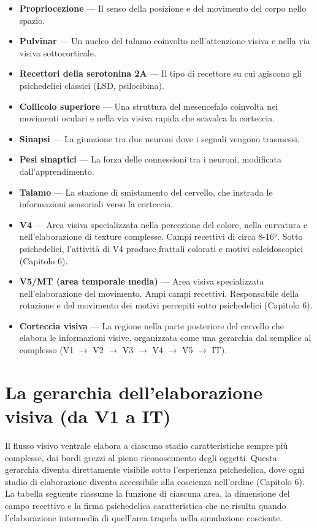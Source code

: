 \documentclass[11pt, twoside, openright]{book}
\begin{document}
\begin{itemize}
  \item \textbf{Propriocezione} --- Il senso della posizione e del movimento del corpo nello spazio.
  \item \textbf{Pulvinar} --- Un nucleo del talamo coinvolto nell'attenzione visiva e nella via visiva sottocorticale.
  \item \textbf{Recettori della serotonina 2A} --- Il tipo di recettore su cui agiscono gli psichedelici classici (LSD, psilocibina).
  \item \textbf{Collicolo superiore} --- Una struttura del mesencefalo coinvolta nei movimenti oculari e nella via visiva rapida che scavalca la corteccia.
  \item \textbf{Sinapsi} --- La giunzione tra due neuroni dove i segnali vengono trasmessi.
  \item \textbf{Pesi sinaptici} --- La forza delle connessioni tra i neuroni, modificata dall'apprendimento.
  \item \textbf{Talamo} --- La stazione di smistamento del cervello, che instrada le informazioni sensoriali verso la corteccia.
  \item \textbf{V4} --- Area visiva specializzata nella percezione del colore, nella curvatura e nell'elaborazione di texture complesse. Campi recettivi di circa 8-16°. Sotto psichedelici, l'attività di V4 produce frattali colorati e motivi caleidoscopici (Capitolo 6).
  \item \textbf{V5/\allowbreak{}MT (area temporale media)} --- Area visiva specializzata nell'elaborazione del movimento. Ampi campi recettivi. Responsabile della rotazione e del movimento dei motivi percepiti sotto psichedelici (Capitolo 6).
  \item \textbf{Corteccia visiva} --- La regione nella parte posteriore del cervello che elabora le informazioni visive, organizzata come una gerarchia dal semplice al complesso (V1 $\rightarrow$ V2 $\rightarrow$ V3 $\rightarrow$ V4 $\rightarrow$ V5 $\rightarrow$ IT).
\end{itemize}

\section*{La gerarchia dell'elaborazione visiva (da V1 a IT)}

Il flusso visivo ventrale elabora a ciascuno stadio caratteristiche sempre più complesse, dai bordi grezzi al pieno riconoscimento degli oggetti. Questa gerarchia diventa direttamente visibile sotto l'esperienza psichedelica, dove ogni stadio di elaborazione diventa accessibile alla coscienza nell'ordine (Capitolo 6). La tabella seguente riassume la funzione di ciascuna area, la dimensione del campo recettivo e la firma psichedelica caratteristica che ne risulta quando l'elaborazione intermedia di quell'area trapela nella simulazione cosciente.
\end{document}
